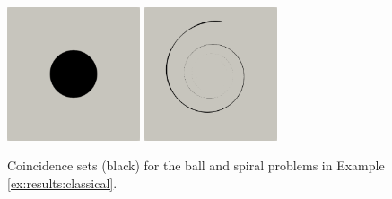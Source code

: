 \documentclass[letterpaper,final,12pt,reqno]{amsart}
\theoremstyle{cstyle}
\theoremstyle{cstyle*}
\theoremstyle{dstyle}
\numberwithin{equation}{section}
\numberwithin{figure}{section}
\numberwithin{table}{section}
\numberwithin{theorem}{section}
\begin{document}
\begin{figure}[ht]
\begin{center}
\includegraphics[width=0.35\textwidth]{fixfigs/ball-set.png} \qquad \includegraphics[width=0.35\textwidth]{fixfigs/spiral-set.png}
\end{center}
\caption{Coincidence sets (black) for the ball and spiral problems in Example \ref{ex:results:classical}.}
\label{fig:results:classical}
\end{figure}
\end{document}

